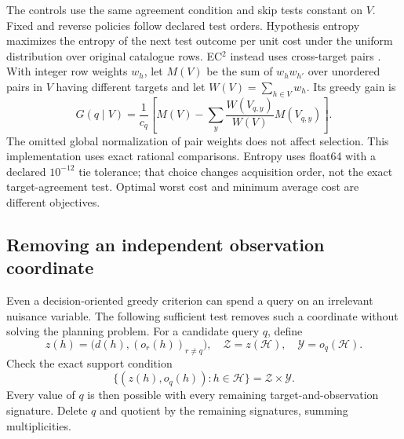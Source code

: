\documentclass[11pt,a4paper]{article}
\theoremstyle{definition}\newtheorem{definition}[theorem]{Definition}
\begin{document}
The controls use the same agreement condition and skip tests constant on $V$. Fixed and reverse policies follow declared test orders. Hypothesis entropy maximizes the entropy of the next test outcome per unit cost under the uniform distribution over original catalogue rows. EC$^2$ instead uses cross-target pairs \cite{golovin2010}. With integer row weights $w_h$, let $M(V)$ be the sum of $w_hw_{h'}$ over unordered pairs in $V$ having different targets and let $W(V)=\sum_{h\in V}w_h$. Its greedy gain is
\begin{equation}
 G(q\mid V)=\frac{1}{c_q}\left[M(V)-\sum_y\frac{W(V_{q,y})}{W(V)}M(V_{q,y})\right].
 \label{eq:ec2specialization}
\end{equation}
The omitted global normalization of pair weights does not affect selection. This implementation uses exact rational comparisons. Entropy uses float64 with a declared $10^{-12}$ tie tolerance; that choice changes acquisition order, not the exact target-agreement test. Optimal worst cost and minimum average cost are different objectives.

\subsection{Removing an independent observation coordinate}\label{sec:queryremoval}
Even a decision-oriented greedy criterion can spend a query on an irrelevant nuisance variable. The following sufficient test removes such a coordinate without solving the planning problem. For a candidate query $q$, define
\begin{equation}
 z(h)=\bigl(d(h),(o_r(h))_{r\ne q}\bigr),\quad
 \mathcal Z=z(\mathcal H),\quad\mathcal Y=o_q(\mathcal H).
\end{equation}
Check the exact support condition
\begin{equation}
 \{(z(h),o_q(h)):h\in\mathcal H\}=\mathcal Z\times\mathcal Y.
 \label{eq:queryproduct}
\end{equation}
Every value of $q$ is then possible with every remaining target-and-observation signature. Delete $q$ and quotient by the remaining signatures, summing multiplicities.
\end{document}
